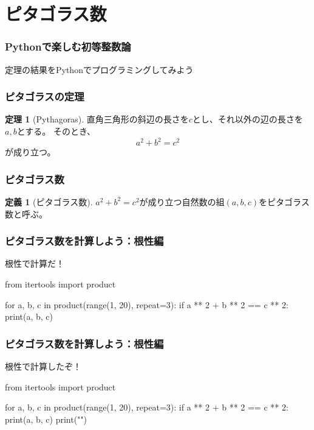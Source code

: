 \documentclass[dvipdfmx,11pt,notheorems]{beamer}
\theoremstyle{definition}
\newtheorem{theorem}{定理}
\newtheorem{definition}{定義}
\begin{document}
\section{ピタゴラス数}

\begin{frame}\frametitle{Pythonで楽しむ初等整数論}
\huge{定理の結果をPythonでプログラミングしてみよう}
\end{frame}

\begin{frame}\frametitle{ピタゴラスの定理}

\begin{theorem}[Pythagoras]
直角三角形の斜辺の長さを$c$とし、それ以外の辺の長さを$a, b$とする。
そのとき、
\begin{equation*}
a^{2} + b^{2} = c^{2}
\end{equation*}
 が成り立つ。
\end{theorem}

\end{frame}

\begin{frame}\frametitle{ピタゴラス数}

\begin{definition}[ピタゴラス数]
$a^{2} + b^{2} = c^{2}$が成り立つ自然数の組$(a, b, c)$をピタゴラス数と呼ぶ。
\end{definition}

\end{frame}

\begin{frame}[fragile]\frametitle{ピタゴラス数を計算しよう：根性編}

\begin{block}{根性で計算だ！}
\begin{pyverbatim}
from itertools import product

for a, b, c in product(range(1, 20), repeat=3):
    if a ** 2 + b ** 2 == c ** 2:
        print(a, b, c)
\end{pyverbatim}
\end{block}

\end{frame}

\begin{frame}[fragile]\frametitle{ピタゴラス数を計算しよう：根性編}

\begin{block}{根性で計算したぞ！}
\begin{pycode}
from itertools import product

for a, b, c in product(range(1, 20), repeat=3):
    if a ** 2 + b ** 2 == c ** 2:
        print(a, b, c)
        print("\n")
\end{pycode}
\end{block}

\end{frame}
\end{document}
